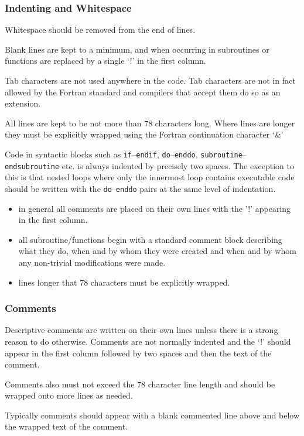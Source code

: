 \documentclass[\mydriver,12pt,twoside,notitlepage,a4paper]{article}
\newcommand{\code}[1]{\texttt{#1}}
\begin{document}
\subsubsection{Indenting and Whitespace}
Whitespace should be removed from the end of lines.

Blank lines are kept to a minimum, and when occurring in subroutines
or functions are replaced by a single `!' in the first column.

Tab characters are not used anywhere in the code.  Tab characters are
not in fact allowed by the Fortran standard and compilers that accept
them do so as an extension.

All lines are kept to be not more than 78 characters long. Where
lines are longer they must be explicitly wrapped using the 
Fortran continuation character `\&'

Code in syntactic blocks such as \code{if}--\code{endif}, \code{do}--\code{enddo},
\code{subroutine}--\code{endsubroutine} etc. is always indented by precisely two spaces.
The exception to this is that nested loops where only the innermost loop
contains executable code should be written with the \code{do}--\code{enddo}
pairs at the same level of indentation.

\begin{itemize}
\item in general all comments are placed on their own lines with the '!' 
appearing in the first column. 
\item all subroutine/functions begin with a standard comment block describing
what they do, when and by whom they were created and when and by whom any
non-trivial modifications were made.
\item lines longer that 78 characters must be explicitly wrapped. 
\end{itemize}

\subsubsection{Comments}
Descriptive comments are written on their own lines unless there is a 
strong reason to do otherwise.  Comments are not normally indented
and the `!' should appear in the first column followed by two spaces
and then the text of the comment.

Comments also must not exceed the 78 character line length and should
be wrapped onto more lines as needed.

Typically comments should appear with a blank commented line above and
below the wrapped text of the comment.
\end{document}
